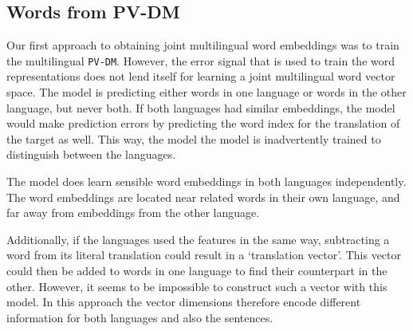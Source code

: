 
% 
% 

\subsection{Words from PV-DM}
Our first approach to obtaining joint multilingual word embeddings was to train the multilingual \texttt{PV-DM}.
However, the error signal that is used to train the word representations does not lend itself for learning a joint multilingual word vector space.
The model is predicting either words in one language or words in the other language, but never both.
If both languages had similar embeddings, the model would make prediction errors by predicting the word index for the translation of the target as well.
This way, the model the model is inadvertently trained to distinguish between the languages.%

The model does learn sensible word embeddings in both languages independently.
The word embeddings are located near related words in their own language, and far away from embeddings from the other language.

Additionally, if the languages used the features in the same way, subtracting a word from its literal translation could result in a `translation vector'.
This vector could then be added to words in one language to find their counterpart in the other.
However, it seems to be impossible to construct such a vector with this model. 
In this approach the vector dimensions therefore encode different information for both languages and also the sentences.



